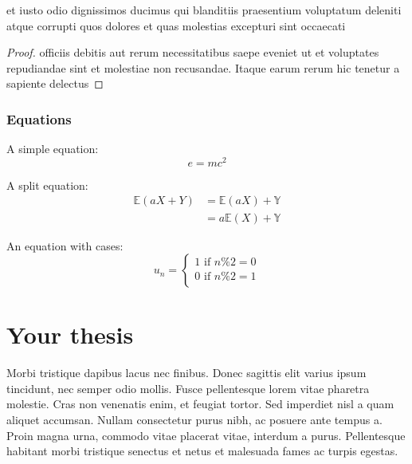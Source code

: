 \documentclass[12pt, twoside]{report}
\begin{document}
\begin{proposition}
	et iusto odio dignissimos ducimus qui blanditiis praesentium voluptatum deleniti atque corrupti quos dolores et quas molestias excepturi sint occaecati
\end{proposition}
\begin{proof}
	officiis debitis aut rerum necessitatibus saepe eveniet ut et voluptates repudiandae sint et molestiae non recusandae.
	Itaque earum rerum hic tenetur a sapiente delectus
\end{proof}

\subsection{Equations}

A simple equation:
\begin{equation}
	e = mc^2
\end{equation}

A split equation:
\begin{equation}
	\begin{split}
		\mathbb{E}(aX + Y) & = \mathbb{E}(aX) + \mathbb{Y} \\
		                   & = a\mathbb{E}(X) + \mathbb{Y}
	\end{split}
\end{equation}

An equation with cases:
\begin{equation}
	u_n =
	\begin{cases}
		1 \text{ if } n\%2=0 \\
		0 \text{ if } n\%2=1 \\
	\end{cases}
\end{equation}



\chapter{Your thesis}\label{chp:stuff}
Morbi tristique dapibus lacus nec finibus.
Donec sagittis elit varius ipsum tincidunt, nec semper odio mollis.
Fusce pellentesque lorem vitae pharetra molestie.
Cras non venenatis enim, et feugiat tortor.
Sed imperdiet nisl a quam aliquet accumsan.
Nullam consectetur purus nibh, ac posuere ante tempus a.
Proin magna urna, commodo vitae placerat vitae, interdum a purus.
Pellentesque habitant morbi tristique senectus et netus et malesuada fames ac turpis egestas.



\end{document}
